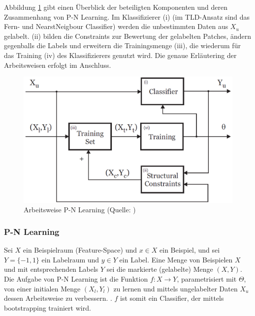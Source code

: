 	Abbildung \ref{abb:pnl} gibt einen Überblick der beteiligten Komponenten
	und deren Zusammenhang von P-N Learning. Im Klassifizierer (i) (im
	TLD-Ansatz sind das Fern- und NearstNeigbour Classifier) werden die
	unbestimmten Daten aus $X_{u}$ gelabelt. (ii) bilden die Constraints
	zur Bewertung der gelabelten Patches, ändern gegenballs die Labels
	und erweitern die Trainingsmenge (iii), die wiederum für das Training
	(iv) des Klassifizierers genutzt wird. Die genaue Erläutering der Arbeitsweisen erfolgt im Anschluss.

	\begin{figure}
	\begin{centering}
	\includegraphics[scale=0.4]{../pictures/PN_LEARNING.png}\caption{Arbeitsweise P-N Learning (Quelle: \cite{PNL})}
	\label{abb:pnl}
	\par\end{centering}
	\end{figure}

	\subsubsection{P-N Learning}

	Sei $X$ ein Beispielraum (Feature-Space) und $x\in X$ ein Beispiel, und sei $Y=\{-1,1\}$ ein Labelraum und $y\in Y$ ein Label. Eine Menge von Beispielen $X$ und mit entsprechenden Labels $Y$ sei die markierte (gelabelte) Menge $(X,Y)$. Die Aufgabe von P-N Learning ist die Funktion $f:X\rightarrow Y$, parametrisiert mit $\Theta$, von einer initialen Menge $(X_{l},Y_{l})$ zu lernen und mittels ungelabelter Daten $X_{u}$ dessen Arbeitsweise zu verbessern. . $f$ ist somit ein Classifier, der mittels bootstrapping trainiert wird.


